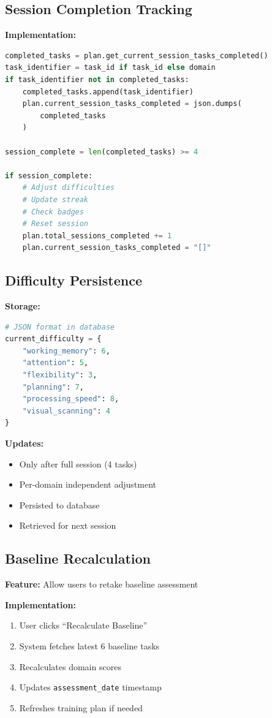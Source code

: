 \documentclass[12pt,a4paper]{article}
\begin{document}
\subsection{Session Completion Tracking}

\textbf{Implementation:}
\begin{lstlisting}[language=Python]
completed_tasks = plan.get_current_session_tasks_completed()
task_identifier = task_id if task_id else domain
if task_identifier not in completed_tasks:
    completed_tasks.append(task_identifier)
    plan.current_session_tasks_completed = json.dumps(
        completed_tasks
    )

session_complete = len(completed_tasks) >= 4

if session_complete:
    # Adjust difficulties
    # Update streak
    # Check badges
    # Reset session
    plan.total_sessions_completed += 1
    plan.current_session_tasks_completed = "[]"
\end{lstlisting}

\subsection{Difficulty Persistence}

\textbf{Storage:}
\begin{lstlisting}[language=Python]
# JSON format in database
current_difficulty = {
    "working_memory": 6,
    "attention": 5,
    "flexibility": 3,
    "planning": 7,
    "processing_speed": 8,
    "visual_scanning": 4
}
\end{lstlisting}

\textbf{Updates:}
\begin{itemize}
    \item Only after full session (4 tasks)
    \item Per-domain independent adjustment
    \item Persisted to database
    \item Retrieved for next session
\end{itemize}

\subsection{Baseline Recalculation}

\textbf{Feature:} Allow users to retake baseline assessment

\textbf{Implementation:}
\begin{enumerate}
    \item User clicks ``Recalculate Baseline''
    \item System fetches latest 6 baseline tasks
    \item Recalculates domain scores
    \item Updates \texttt{assessment\_date} timestamp
    \item Refreshes training plan if needed
\end{enumerate}
\end{document}
